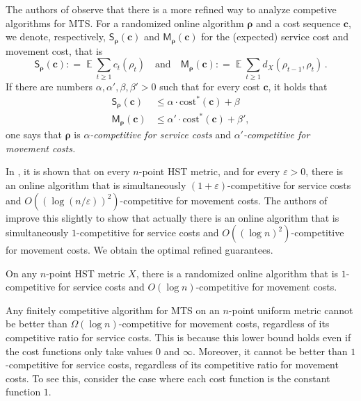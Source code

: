 \documentclass{toc}
\newcommand{\cost}{\mathrm{cost}}
\newcommand{\eps}{\varepsilon}
\newcommand{\mcost}{\mathsf{M}}
\newcommand{\scost}{\mathsf{S}}
\newcommand{\seteq}{\mathrel{\mathop:}=}
\DeclareMathOperator*{\Exp}{\mathbb{E}}
\begin{document}
The authors of \cite{BBN10} observe that there is a more refined way to analyze
competive algorithms for MTS.
For a randomized online algorithm $\bm{\rho}$ and a cost sequence $\bm{c}$, we denote, respectively, $\scost_{\bm{\rho}}(\bm{c})$
and $\mcost_{\bm{\rho}}(\bm{c})$ for the (expected) service cost and movement cost, that is
\[
\scost_{\bm{\rho}}(\bm{c}) \seteq \Exp \sum_{t \geq 1} c_t(\rho_t) \quad \text{and}\quad \mcost_{\bm{\rho}}(\bm{c}) \seteq \Exp \sum_{t\geq1}d_X(\rho_{t-1}, \rho_t) \,.
\]
If there are numbers $\alpha,\alpha',\beta,\beta' > 0$ such that
for every cost $\bm{c}$, it holds that
\begin{align*}
\scost_{\bm\rho}(\bm{c}) &\leq \alpha \cdot \cost^*(\bm{c})+\beta \\
\mcost_{\bm\rho}(\bm{c}) &\leq \alpha' \cdot \cost^*(\bm{c})+\beta',
\end{align*}
one says that $\bm{\rho}$ is \emph{$\alpha$-competitive for service costs} and \emph{$\alpha'$-competitive for movement costs.}

In \cite{BBN10}, it is shown that on every $n$-point HST metric, and
for every $\eps > 0$, there is an online algorithm that is simultaneously
$(1+\eps)$-competitive for service costs and $O((\log (n/\eps))^2)$-competitive for movement costs.
The authors of \cite{BCLL19} improve this slightly to show that actually
there is an online algorithm that is simultaneously $1$-competitive for service costs
and $O((\log n)^2)$-competitive for movement costs.
We obtain the optimal refined guarantees.

\begin{theorem} \label{thm:refined}
	On any $n$-point HST metric $X$, there
	is a randomized  online algorithm that is $1$-competitive for service costs and $O(\log n)$-competitive for movement costs.
\end{theorem}

\begin{remark}
	Any finitely competitive algorithm for MTS on an $n$-point uniform metric
	cannot be better than $\Omega(\log n)$-competitive for movement costs,
	regardless of its competitive ratio for service costs. This is because this lower bound holds even if the cost functions only take values $0$ and $\infty$. Moreover, it cannot be better than $1$-competitive for service costs, regardless of its competitive ratio for movement costs. To see this, consider the case where each cost function is the constant function $1$.
\end{remark}
\end{document}
